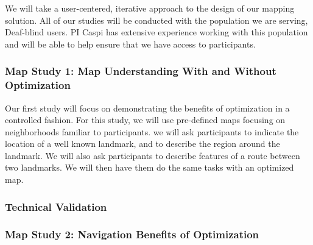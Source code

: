 We will take a user-centered, iterative approach to the design of our mapping solution. All of our studies will be conducted with the population we are serving, Deaf-blind users. PI Caspi has extensive experience working with this population  and will be able to help ensure that we have access to participants. 

\subsubsection{Map Study 1: Map Understanding With and Without Optimization}
\label{sec:lab-tests}
Our first study will focus on demonstrating the benefits of optimization in a controlled fashion. For this study, we will use pre-defined maps focusing on neighborhoods familiar to participants. we will ask participants to indicate the location of a well known landmark, and to describe the region around the landmark. We will also ask participants to describe features of a route between two landmarks. We will then have them do the same tasks with an optimized map. 

\subsubsection{Technical Validation}

\subsubsection{Map Study 2: Navigation Benefits of Optimization}
\label{sec:field-map}


